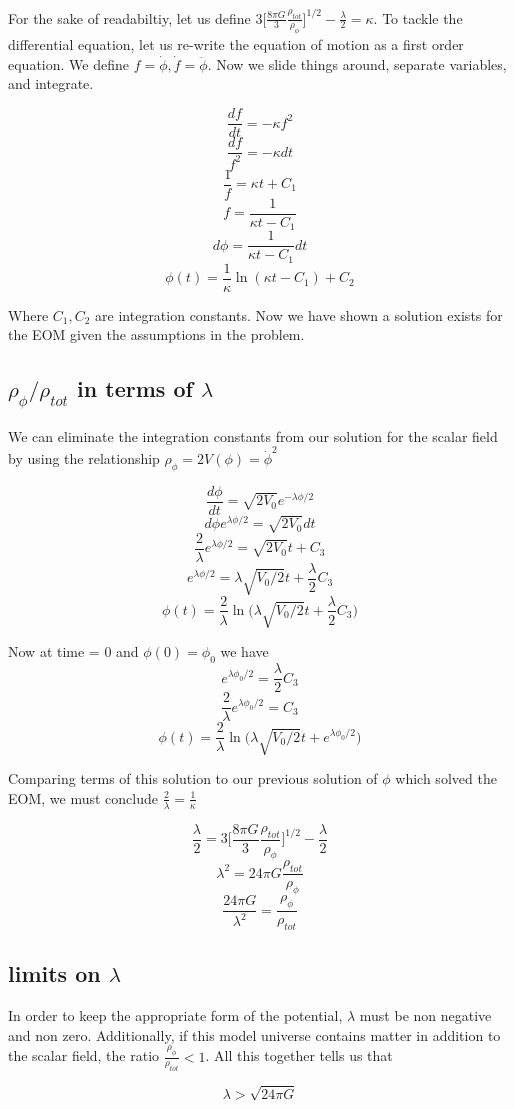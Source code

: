 \documentclass[12pt]{article}
\begin{document}
 For the sake of readabiltiy, let us define $3\Big[ \frac{8 \pi G}{3} \frac{\rho_{tot}}{ \rho_{\phi}} \Big]^{1/2} - \frac{\lambda}{2} = \kappa $. To tackle the differential equation, let us re-write the equation of motion as a first order equation. We define $f = \dot{\phi}, \dot{f} = \ddot{\phi}$. Now we slide things around, separate variables, and integrate. 
 
 $$\frac{d f}{d t} = -\kappa f^2 $$
 $$ \frac{df}{f^2} = -\kappa dt$$
 $$ \frac{1}{f} = \kappa t + C_1 $$
 $$ f = \frac{1}{\kappa t - C_1} $$
 $$ d\phi = \frac{1}{\kappa t - C_1} dt$$
 $$ \phi(t) = \frac{1}{\kappa} \ln(\kappa t - C_1) + C_2 $$
 
Where $C_1, C_2$ are integration constants. Now we have shown a solution exists for the EOM given the assumptions in the problem.

\subsection{$\rho_{\phi}/\rho_{tot}$ in terms of $\lambda$}

We can eliminate the integration constants from our solution for the scalar field by using the relationship $\rho_{\phi} = 2V(\phi) = \dot{\phi}^2$

$$ \frac{d\phi}{dt} = \sqrt{2V_0}e^{-\lambda \phi/2} $$
$$ d\phi e^{\lambda \phi/2}= \sqrt{2V_0} dt$$
$$  \frac{2}{\lambda} e^{\lambda \phi/2}= \sqrt{2V_0} t + C_3$$
$$ e^{\lambda \phi/2}= \lambda \sqrt{V_{0}/2} t + \frac{\lambda}{2}C_3$$
$$ \phi(t)= \frac{2}{\lambda} \ln  \Big(\lambda \sqrt{V_{0}/2} t + \frac{\lambda}{2}C_3 \Big)$$

Now at time = 0 and $\phi(0) = \phi_0$ we have
$$ e^{\lambda \phi_{0}/2} =  \frac{\lambda}{2}C_3$$
$$ \frac{2}{\lambda} e^{\lambda \phi_{0}/2} = C_3$$
$$ \phi(t)= \frac{2}{\lambda} \ln  \Big(\lambda \sqrt{V_{0}/2} t + e^{\lambda \phi_{0}/2} \Big)$$

Comparing terms of this solution to our previous solution of $\phi$ which solved the EOM, we must conclude $\frac{2}{\lambda} = \frac{1}{\kappa}$

$$ \frac{\lambda}{2}  = 3\Big[ \frac{8 \pi G}{3} \frac{\rho_{tot}}{ \rho_{\phi}} \Big]^{1/2} - \frac{\lambda}{2} $$
$$ \lambda^2 = 24 \pi G \frac{\rho_{tot}}{ \rho_{\phi}}$$
$$ \frac{24\pi G}{\lambda ^2}  = \frac{\rho_{\phi}}{ \rho_{tot}}$$

\subsection{limits on $\lambda$}

In order to keep the appropriate form of the potential, $\lambda$ must be non negative and non zero. Additionally, if this model universe contains matter in addition to the scalar field, the ratio  $\frac{\rho_{\phi}}{ \rho_{tot}} < 1$. All this together tells us that

$$  \lambda > \sqrt{24 \pi G} $$ 
\end{document}
